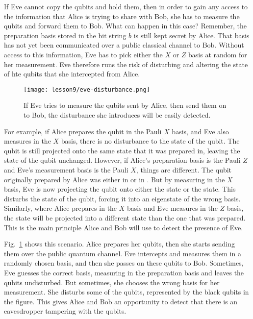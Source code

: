 If Eve cannot copy the qubits and hold them, then in order to gain any access to the information that Alice is trying to share with Bob, she has to measure the qubits and forward them to Bob.
What can happen in this case?
Remember, the preparation basis stored in the bit string $b$ is still kept secret by Alice.
That basis has not yet been communicated over a public classical channel to Bob.
Without access to this information, Eve has to pick either the $X$ or $Z$ basis at random for her measurement.
Eve therefore runs the risk of disturbing and altering the state of hte qubits that she intercepted from Alice.

\begin{figure}[t]
    \centering
    \texttt{[image: lesson9/eve-disturbance.png]}
        \caption[Eve's measurements disturb the qubits.]{If Eve tries to measure  the qubits sent by Alice, then send them on to Bob, the disturbance she introduces will be easily detected.}
    \label{fig:eve-disturbance}
\end{figure}

For example, if Alice prepares the qubit in the Pauli $X$ basis, and Eve also measures in the $X$ basis, there is no disturbance to the state of the qubit.
The qubit is still projected onto the same state that it was prepared in, leaving the state of the qubit unchanged.
However, if Alice's preparation basis is the Pauli $Z$ and Eve's measurement basis is the Pauli $X$, things are different.
The qubit originally prepared by Alice was either in  or in .
But by measuring in the $X$ basis, Eve is now projecting the qubit onto either the \ket{+} state or the \ket{-} state.
This disturbs the state of the qubit, forcing it into an eigenstate of the wrong basis.
Similarly, where Alice prepares in the $X$ basis and Eve measures in the $Z$ basis, the state will be projected into a different state than the one that was prepared.
This is the main principle Alice and Bob will use to detect the presence of Eve.

Fig.~\ref{fig:eve-disturbance} shows this scenario.
Alice prepares her qubits, then she starts sending them over the public quantum channel.
Eve intercepts and measures them in a randomly chosen basis, and then she passes on these qubits to Bob.
Sometimes, Eve guesses the correct basis, measuring in the preparation basis and leaves the qubits undisturbed.
But sometimes, she chooses the wrong basis for her measurement.
She disturbs some of the qubits, represented by the black qubits in the figure.
This gives Alice and Bob an opportunity to detect that there is an eavesdropper tampering with the qubits.

